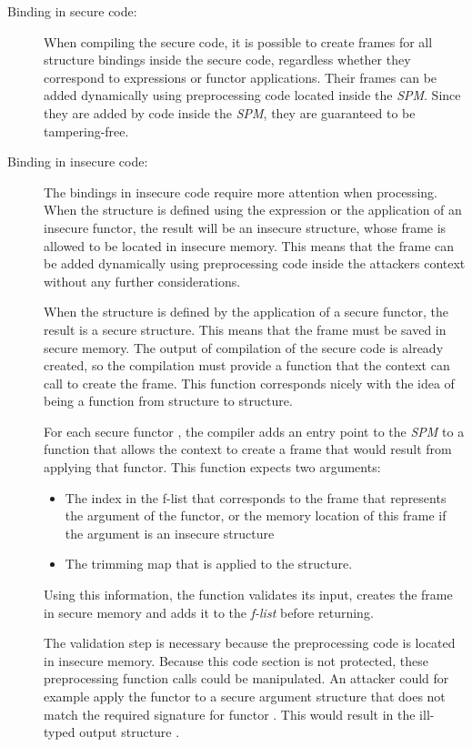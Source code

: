 \begin{description}
\item[Binding in secure code:] When compiling the secure code, it is possible to create frames for all structure bindings inside the secure code, regardless whether they correspond to  expressions or functor applications.
Their frames can be added dynamically using preprocessing code located inside the \emph{SPM}. 
Since they are added by code inside the \emph{SPM}, they are guaranteed to be tampering-free.
\item[Binding in insecure code:] The bindings in insecure code require more attention when processing.
When the structure is defined using the  expression or the application of an insecure functor, the result will be an insecure structure, whose frame is allowed to be located in insecure memory.
This means that the frame can be added dynamically using preprocessing code inside the attackers context without any further considerations.

When the structure is defined by the application of a secure functor, the result is a secure structure.
This means that the frame must be saved in secure memory.
The output of compilation of the secure code is already created, so the compilation must provide a function that the context can call to create the frame.
This function corresponds nicely with the idea of  being a function from structure to structure.

For each secure functor , the compiler adds an entry point to the \emph{SPM} to a function that allows the context to create a frame that would result from applying that functor.
This function expects two arguments: 
\begin{itemize}
\item The index in the f-list that corresponds to the frame that represents the argument of the functor, or the memory location of this frame if the argument is an insecure structure
\item The trimming map that is applied to the structure.
\end{itemize}
Using this information, the function validates its input, creates the frame in secure memory and adds it to the \emph{f-list} before returning.

The validation step is necessary because the preprocessing code is located in insecure memory.
Because this code section is not protected, these preprocessing function calls could be manipulated. 
An attacker could for example apply the functor  to a secure argument structure  that does not match the required signature for functor . 
This would result in the ill-typed output structure .


\end{description}
